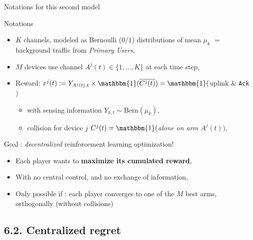 \documentclass[12pt,english,ignorenonframetext,]{beamer}
\providecommand{\tightlist}{%
  \setlength{\itemsep}{0pt}\setlength{\parskip}{0pt}}
\begin{document}
\begin{frame}[fragile]{Notations for this second model}

\begin{block}{Notations}

\begin{itemize}
\tightlist
\item
  \(K\) channels, modeled as Bernoulli (\(0/1\)) distributions of mean
  \(\mu_k\) \(=\) background traffic from \emph{Primary Users},
\item
  \(M\) devices use channel \(A^j(t) \in \{1,\dots,K\}\) at each time
  step,
\item
  Reward:
  \(r^j(t) := Y_{A^j(t),t} \times \mathbbm{1}(\overline{C^j(t)}) = \mathbbm{1}(\)uplink
  \& \texttt{Ack}\()\)

  \begin{itemize}
  \tightlist
  \item
    with sensing information \(Y_{k,t} \sim \mathrm{Bern}(\mu_k)\),
  \item
    collision for device \(j\)
    \(C^j(t) = \mathbbm{1}(\)\emph{alone on arm $A^j(t)$}\()\).
  \end{itemize}
\end{itemize}

\pause

\end{block}

\begin{block}{Goal : \emph{decentralized} reinforcement learning
optimization!}

\begin{itemize}
\tightlist
\item
  Each player wants to \textbf{maximize its cumulated reward},
\item
  With no central control, and no exchange of information,
\item
  Only possible if : each player converges to one of the \(M\) best
  arms, orthogonally (without collisions)
\end{itemize}

\end{block}

\end{frame}



\subsection{\hfill{}6.2. Centralized regret\hfill{}}
\end{document}
